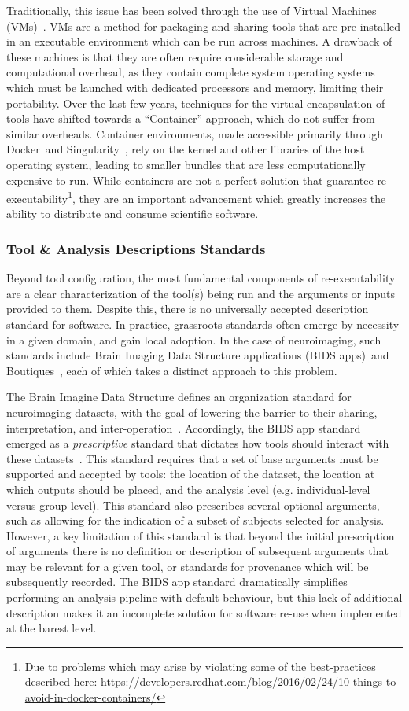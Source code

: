 Traditionally, this issue has been solved through the use of Virtual Machines (VMs)~\tocite. VMs are a method for
packaging and sharing tools that are pre-installed in an executable environment which can be run across
machines. A drawback of these machines is that they are often require considerable storage and computational overhead,
as they contain complete system operating systems which must be launched with dedicated processors and memory, limiting
their portability. Over the last few years, techniques for the virtual encapsulation of tools have shifted towards a
``Container'' approach, which do not suffer from similar overheads. Container environments, made accessible primarily
through Docker~\tocite and Singularity~\tocite, rely on the kernel and other libraries of the host operating system,
leading to smaller bundles that are less computationally expensive to run. While containers are not a perfect solution
that guarantee re-executability\footnote{Due to problems which may arise by violating some of the best-practices
described here: \url{https://developers.redhat.com/blog/2016/02/24/10-things-to-avoid-in-docker-containers/}}, they are
an important advancement which greatly increases the ability to distribute and consume scientific software.

\subsubsection{Tool \& Analysis Descriptions Standards}
Beyond tool configuration, the most fundamental components of re-executability are a clear characterization of the
tool(s) being run and the arguments or inputs provided to them. Despite this, there is no universally accepted
description standard for software. In practice, grassroots standards often emerge by necessity in a given domain, and
gain local adoption. In the case of neuroimaging, such standards include Brain Imaging Data Structure applications
(BIDS apps)~\tocite and Boutiques~\tocite, each of which takes a distinct approach to this problem.

The Brain Imagine Data Structure defines an organization standard for neuroimaging datasets, with the goal of lowering
the barrier to their sharing, interpretation, and inter-operation~\tocite. Accordingly, the BIDS app standard emerged
as a \textit{prescriptive} standard that dictates how tools should interact with these datasets~\tocite. This standard
requires that a set of base arguments must be supported and accepted by tools: the location of the dataset, the
location at which outputs should be placed, and the analysis level (e.g. individual-level versus group-level). This
standard also prescribes several optional arguments, such as allowing for the indication of a subset of subjects
selected for analysis. However, a key limitation of this standard is that beyond the initial prescription of arguments
there is no definition or description of subsequent arguments that may be relevant for a given tool, or standards for
provenance which will be subsequently recorded. The BIDS app standard dramatically simplifies performing an analysis
pipeline with default behaviour, but this lack of additional description makes it an incomplete solution for software
re-use when implemented at the barest level.

